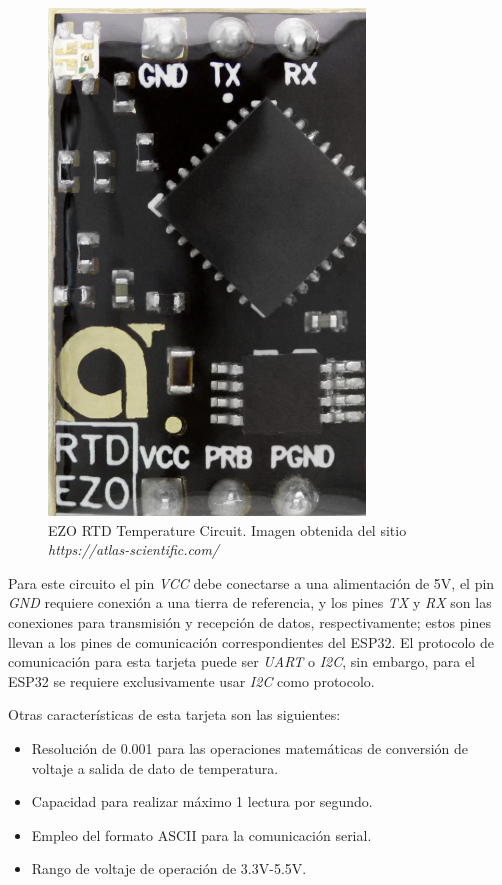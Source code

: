 \begin{figure}[h]
	\centering
	\includegraphics[scale=0.7]{imgss208.png}
	\caption{EZO RTD Temperature Circuit. Imagen obtenida del sitio \textit{https://atlas-scientific.com/}}
	\label{fig:figura500_8}
\end{figure}

Para este circuito el pin \textit{VCC} debe conectarse a una alimentación de 5V, el pin \textit{GND} requiere conexión a una tierra de referencia, y los pines \textit{TX} y \textit{RX} son las conexiones para transmisión y 
recepción de datos, respectivamente; estos pines llevan a los pines de comunicación correspondientes del ESP32. El protocolo de comunicación para esta tarjeta puede ser \textit{UART} o \textit{I2C}, sin embargo, para el ESP32 
se requiere exclusivamente usar \textit{I2C} como protocolo.

Otras características de esta tarjeta son las siguientes:

\begin{itemize}
    \item Resolución de 0.001 para las operaciones matemáticas de conversión de voltaje a salida de dato de temperatura.
    \item Capacidad para realizar máximo 1 lectura por segundo.
    \item Empleo del formato ASCII para la comunicación serial.
    \item Rango de voltaje de operación de 3.3V-5.5V.
\end{itemize}

